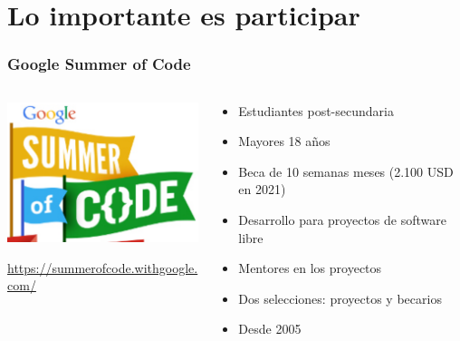 %
%

\section{Lo importante es participar}

\begin{frame}
\frametitle{Google Summer of Code}

\begin{columns}[T]
\begin{column}{.38\textwidth}
\includegraphics[width=6.5cm]{figs/gsoc-logo}

\begin{flushright}
{\small
\url{https://summerofcode.withgoogle.com/}
}
\end{flushright}

\end{column}%
\hfill%
\begin{column}{.60\textwidth}
{\Large
\begin{itemize}
\item Estudiantes post-secundaria
\item Mayores 18 años
\item Beca de 10 semanas meses (2.100 USD en 2021) 
\item Desarrollo para proyectos de software libre
\item Mentores en los proyectos
\item Dos selecciones: proyectos y becarios
\item Desde 2005
\end{itemize}
}
\end{column}%
\end{columns}

\end{frame}

